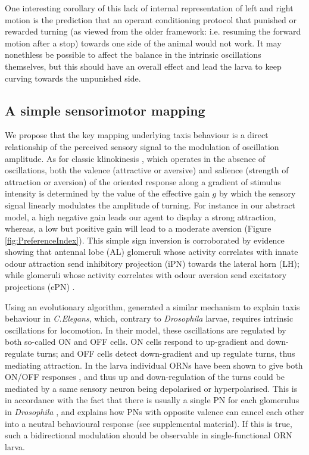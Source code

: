\documentclass[11pt,a4paper]{article}
\newcommand{\Dros }{\emph{Drosophila }}
\newcommand{\todoAW}[1]{\todo[author=AW,color=green, size=\tiny,inline]{#1}}
\newcommand{\todoBW}[1]{\todo[author=BW,color=orange, size=\tiny,inline]{#1}}
\newcommand{\todoML}[1]{\todo[author=ML,color=white, size=\tiny,inline]{#1}}
\begin{document}
  One interesting corollary of this lack of internal representation of left and right motion is the prediction that an operant conditioning protocol that punished or rewarded turning (as viewed from the older framework: i.e. resuming the forward motion after a stop) towards one side of the animal would not work. It may nonethless be possible to affect the balance in the intrinsic oscillations themselves, but this should have an overall effect and lead the larva to keep curving towards the unpunished side.  


\subsection{A simple sensorimotor mapping}
We propose that the key mapping underlying taxis behaviour is a direct relationship of the perceived sensory signal to the modulation of oscillation amplitude.
As for classic klinokinesis \citep{benhamou1989animals}, which operates in the absence of oscillations, both the valence (attractive or aversive) and salience (strength of attraction or aversion) of the oriented response along a gradient of stimulus intensity is determined by the value of the effective gain $g$ by which the sensory signal linearly modulates the amplitude of turning. For instance in our abstract model, a high negative gain leads our agent to display a strong attraction, whereas, a low but positive gain will lead to a moderate aversion (Figure \ref{fig:PreferenceIndex}). This simple sign inversion is corroborated by evidence showing that antennal lobe (AL) glomeruli whose activity correlates with innate odour attraction send inhibitory projection (iPN) towards the lateral horn (LH); while glomeruli whose activity correlates with odour aversion send excitatory projections (ePN) \citep{liang2013gabaergic, knaden2012spatial}. 

Using an evolutionary algorithm, \cite{izquierdo2010evolution} generated a similar mechanism to explain taxis behaviour in {\it C.Elegans}, which, contrary to \Dros larvae, requires intrinsic oscillations for locomotion.
 In their model, these oscillations are regulated by both so-called ON and OFF cells. ON cells respond to up-gradient and down-regulate turns; and OFF cells detect down-gradient and up regulate turns, thus mediating attraction.
  In the larva individual ORNs have been shown to give both ON/OFF responses \citep{schulze2015dynamical}, and thus up and down-regulation of the turns could be mediated by a same sensory neuron being depolarised or hyperpolarised.
   This is in accordance with the fact that there is usually a single PN for each glomerulus in \Dros \citep{ramaekers2005glomerular}, %
 and explains how PNs with opposite valence can cancel each other into a neutral behavioural response (see supplemental material). If this is true, such a bidirectional modulation should be observable in single-functional ORN larva. 
  
\end{document}
